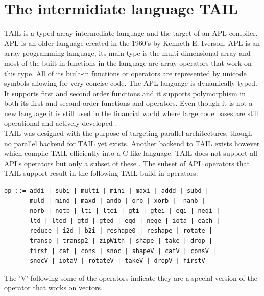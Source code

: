 \documentclass[11pt]{article}
\begin{document}
\section{The intermidiate language TAIL}

TAIL is a typed array intermediate language and the target of an APL compiler.
APL is an older language created in the 1960's by Kenneth E. Iverson.
APL is an array programming language, its main type is the multi-dimensional array 
and most of the built-in functions in the language are array operators that work on this type. 
All of its built-in functions or operators are represented by unicode symbols allowing for very concise code.
The APL language is dynamically typed. It supports first and second order functions and it supports polymorphism in 
both its first and second order functions and operators. 
Even though it is not a new language it is still used in the financial world 
where large code bases are still operational and actively developed \cite{ElsmanDybdal:Array:2014}. \\



TAIL was designed with the purpose of targeting parallel architectures, though no parallel backend for TAIL yet exists.
Another backend to TAIL exists however which compile TAIL efficiently into a C-like language. TAIL does not support
 all APLs operators but only a subset of these \cite{ElsmanDybdal:Array:2014}. 
The subset of APL operators that TAIL support result in the following TAIL build-in operators:

\begin{lstlisting}[numbers=none,frame=none]
op ::= addi | subi | multi | mini | maxi | addd | subd | 
       muld | mind | maxd | andb | orb | xorb |  nanb | 
       norb | notb | lti | ltei | gti | gtei | eqi | neqi |
       ltd | lted | gtd | gted | eqd | neqe | iota | each |
       reduce | i2d | b2i | reshape0 | reshape | rotate |
       transp | transp2 | zipWith | shape | take | drop |
       first | cat | cons | snoc | shapeV | catV | consV | 
       snocV | iotaV | rotateV | takeV | dropV | firstV 
\end{lstlisting}

The 'V' following some of the operators indicate they are a special version of the operator that works on vectors. \\

\end{document}
